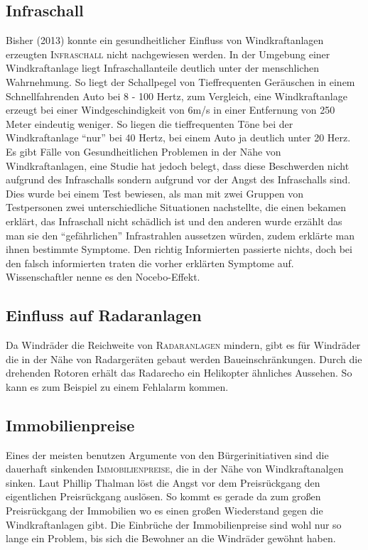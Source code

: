 \documentclass[12pt]{scrbook}
\begin{document}
\newpage

\subsection{Infraschall}

Bisher (2013) konnte ein gesundheitlicher Einfluss von Windkraftanlagen
erzeugten \textsc{Infraschall} nicht nachgewiesen werden. In der Umgebung einer
Windkraftanlage liegt Infraschallanteile deutlich unter der menschlichen
Wahrnehmung.  So liegt der Schallpegel von Tieffrequenten Geräuschen in einem
Schnellfahrenden Auto bei 8 - 100 Hertz, zum Vergleich, eine Windkraftanlage
erzeugt bei einer Windgeschindigkeit von 6m/s in einer Entfernung von 250
Meter eindeutig weniger. So liegen die tieffrequenten Töne bei der
Windkraftanlage "`nur"' bei 40 Hertz, bei einem Auto ja deutlich unter 20 Herz.
Es gibt Fälle von Gesundheitlichen Problemen in der Nähe von Windkraftanlagen,
eine Studie hat jedoch belegt, dass diese Beschwerden nicht aufgrund des
Infraschalls sondern aufgrund vor der Angst des Infraschalls sind. Dies wurde
bei einem Test bewiesen, als man mit zwei Gruppen von Testpersonen zwei
unterschiedliche Situationen nachstellte, die einen bekamen erklärt, das
Infraschall nicht schädlich ist und den anderen wurde erzählt das man sie den
"`gefährlichen"' Infrastrahlen aussetzen würden, zudem erklärte man ihnen
bestimmte Symptome. Den richtig Informierten passierte nichts, doch bei den
falsch informierten traten die vorher erklärten Symptome auf. Wissenschaftler
nenne es den Nocebo-Effekt.

\subsection{Einfluss auf Radaranlagen}

Da Windräder die Reichweite von \textsc{Radaranlagen} mindern, gibt es für Windräder die
in der Nähe von Radargeräten gebaut werden Baueinschränkungen. Durch die
drehenden Rotoren erhält das Radarecho ein Helikopter ähnliches Aussehen. So
kann es zum Beispiel zu einem Fehlalarm kommen.

\subsection{Immobilienpreise}

Eines der meisten benutzen Argumente von den Bürgerinitiativen sind die
dauerhaft sinkenden \textsc{Immobilienpreise}, die in der Nähe von Windkraftanalgen
sinken. Laut Phillip Thalman löst die Angst vor dem Preisrückgang den
eigentlichen Preisrückgang auslösen. So kommt es gerade da zum großen
Preisrückgang der Immobilien wo es einen großen Wiederstand gegen die
Windkraftanlagen gibt. Die Einbrüche der Immobilienpreise sind wohl nur so
lange ein Problem, bis sich die Bewohner an die Windräder gewöhnt haben.
\end{document}
